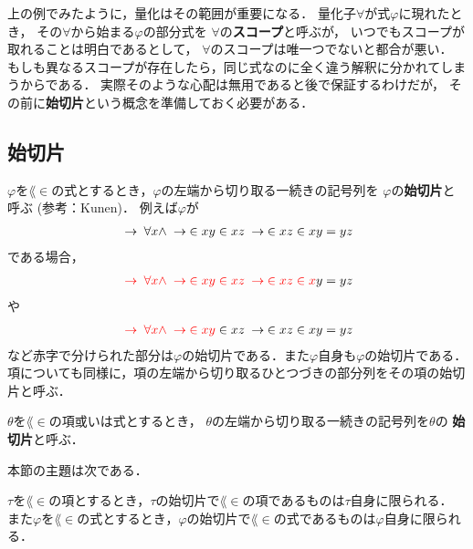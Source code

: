	上の例でみたように，量化はその範囲が重要になる．
	量化子$\forall$が式$\varphi$に現れたとき，
	その$\forall$から始まる$\varphi$の部分式を
	$\forall$の{\bf スコープ}と呼ぶが，
	いつでもスコープが取れることは明白であるとして，
	$\forall$のスコープは唯一つでないと都合が悪い．
	もしも異なるスコープが存在したら，同じ式なのに全く違う解釈に分かれてしまうからである．
	実際そのような心配は無用であると後で保証するわけだが，
	その前に{\bf 始切片}という概念を準備しておく必要がある．
	
\subsection{始切片}
	$\varphi$を$\lang{\in}$の式とするとき，$\varphi$の左端から切り取る一続きの記号列を
	$\varphi$の{\bf 始切片}と呼ぶ
	(参考：Kunen\cite{Kunen})．
	例えば$\varphi$が
	\begin{align}
		\hspace{0.25em}\rightarrow\hspace{0.25em} \forall x \wedge \hspace{0.25em}\rightarrow\hspace{0.25em} \in xy \in xz \hspace{0.25em}\rightarrow\hspace{0.25em} \in xz \in xy = yz
	\end{align}
	である場合，
	\begin{align}
		\textcolor{red}{\hspace{0.25em}\rightarrow\hspace{0.25em} \forall x \wedge \hspace{0.25em}\rightarrow\hspace{0.25em} \in xy \in xz \hspace{0.25em}\rightarrow\hspace{0.25em} \in xz \in x}y = yz
	\end{align}
	や
	\begin{align}
		\textcolor{red}{\hspace{0.25em}\rightarrow\hspace{0.25em} \forall x \wedge \hspace{0.25em}\rightarrow\hspace{0.25em} \in xy} \in xz \hspace{0.25em}\rightarrow\hspace{0.25em} \in xz \in xy = yz
	\end{align}
	など赤字で分けられた部分は$\varphi$の始切片である．また$\varphi$自身も$\varphi$の始切片である．
	項についても同様に，項の左端から切り取るひとつづきの部分列をその項の始切片と呼ぶ．
	
	\begin{screen}
		\begin{metadfn}
		\label{metadfn:L_in_initial_segment}
			$\theta$を$\lang{\in}$の項或いは式とするとき，
			$\theta$の左端から切り取る一続きの記号列を$\theta$の
			{\bf 始切片}と呼ぶ．
		\end{metadfn}
	\end{screen}
	
	本節の主題は次である．
	\begin{screen}
		\begin{metathm}[始切片の一意性]\label{metathm:initial_segment_L_in}
			$\tau$を$\lang{\in}$の項とするとき，$\tau$の始切片で$\lang{\in}$の項であるものは$\tau$自身に限られる．
			また$\varphi$を$\lang{\in}$の式とするとき，$\varphi$の始切片で$\lang{\in}$の式であるものは$\varphi$自身に限られる．
		\end{metathm}
	\end{screen}
	
